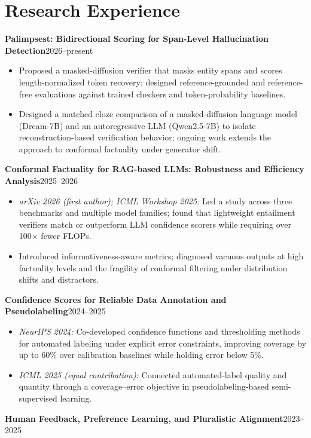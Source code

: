 \documentclass[11pt,letterpaper]{article}
\newcommand{\entry}[2]{\Needspace{4\baselineskip}\textbf{#1}\hfill #2\par}
\begin{document}
\section*{Research Experience}
\entry{Palimpsest: Bidirectional Scoring for Span-Level Hallucination Detection}{2026--present}
\begin{itemize}
\item Proposed a masked-diffusion verifier that masks entity spans and scores length-normalized token recovery; designed reference-grounded and reference-free evaluations against trained checkers and token-probability baselines.
\item Designed a matched cloze comparison of a masked-diffusion language model (Dream-7B) and an autoregressive LLM (Qwen2.5-7B) to isolate reconstruction-based verification behavior; ongoing work extends the approach to conformal factuality under generator shift.
\end{itemize}
\entry{Conformal Factuality for RAG-based LLMs: Robustness and Efficiency Analysis}{2025--2026}
\begin{itemize}
\item \textit{arXiv 2026 (first author); ICML Workshop 2025:} Led a study across three benchmarks and multiple model families; found that lightweight entailment verifiers match or outperform LLM confidence scorers while requiring over 100$\times$ fewer FLOPs.
\item Introduced informativeness-aware metrics; diagnosed vacuous outputs at high factuality levels and the fragility of conformal filtering under distribution shifts and distractors.
\end{itemize}
\entry{Confidence Scores for Reliable Data Annotation and Pseudolabeling}{2024--2025}
\begin{itemize}
\item \textit{NeurIPS 2024:} Co-developed confidence functions and thresholding methods for automated labeling under explicit error constraints, improving coverage by up to 60\% over calibration baselines while holding error below 5\%.
\item \textit{ICML 2025 (equal contribution):} Connected automated-label quality and quantity through a coverage--error objective in pseudolabeling-based semi-supervised learning.
\end{itemize}
\entry{Human Feedback, Preference Learning, and Pluralistic Alignment}{2023--2025}
\end{document}
